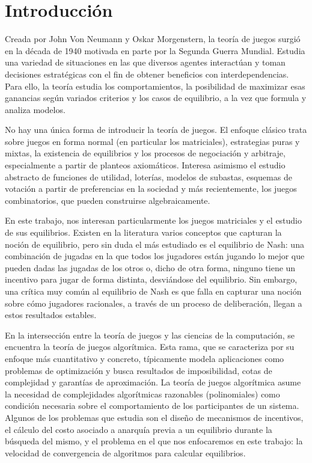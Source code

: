 \chapter{Introducción} \label{cap:intro}

Creada por John Von Neumann y Oskar Morgenstern, la teoría de juegos surgió en la década de 1940 motivada en parte por la Segunda Guerra Mundial. Estudia una variedad de situaciones en las que diversos agentes interactúan y toman decisiones estratégicas con el fin de obtener beneficios con interdependencias. Para ello, la teoría estudia los comportamientos, la posibilidad de maximizar esas ganancias según variados criterios y los casos de equilibrio, a la vez que formula y analiza modelos.

No hay una única forma de introducir la teoría de juegos. El enfoque clásico trata sobre juegos en forma normal (en particular los matriciales), estrategias puras y mixtas, la existencia de equilibrios y los procesos de negociación y arbitraje, especialmente a partir de planteos axiomáticos. Interesa asimismo el estudio abstracto de funciones de utilidad, loterías, modelos de subastas, esquemas de votación a partir de preferencias en la sociedad y más recientemente, los juegos combinatorios, que pueden construirse algebraicamente.

En este trabajo, nos interesan particularmente los juegos matriciales y el estudio de sus equilibrios. Existen en la literatura varios conceptos que capturan la noción de equilibrio, pero sin duda el más estudiado es el equilibrio de Nash: una combinación de jugadas en la que todos los jugadores están jugando lo mejor que pueden dadas las jugadas de los otros o, dicho de otra forma, ninguno tiene un incentivo para jugar de forma distinta, desviándose del equilibrio. Sin embargo, una crítica muy común al equilibrio de Nash es que falla en capturar una noción sobre cómo jugadores racionales, a través de un proceso de deliberación, llegan a estos resultados estables.

En la intersección entre la teoría de juegos y las ciencias de la computación, se encuentra la teoría de juegos algorítmica. Esta rama, que se caracteriza por su enfoque más cuantitativo y concreto, típicamente modela aplicaciones como problemas de optimización y busca resultados de imposibilidad, cotas de complejidad y garantías de aproximación. La teoría de juegos algorítmica asume la necesidad de complejidades algorítmicas razonables (polinomiales) como condición necesaria sobre el comportamiento de los participantes de un sistema. Algunos de los problemas que estudia son el diseño de mecanismos de incentivos, el cálculo del costo asociado a anarquía previa a un equilibrio durante la búsqueda del mismo, y el problema en el que nos enfocaremos en este trabajo: la velocidad de convergencia de algoritmos para calcular equilibrios.

